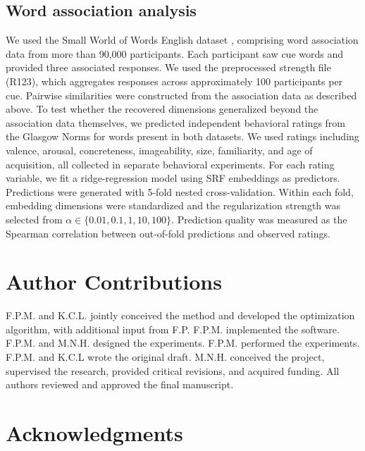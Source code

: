 \documentclass{article}
\begin{document}
\subsection{Word association analysis}

We used the Small World of Words English dataset \citep{DeDeyne2019}, comprising word association data from more than 90{,}000 participants. Each participant saw cue words and provided three associated responses. We used the preprocessed strength file (R123), which aggregates responses across approximately 100 participants per cue. Pairwise similarities were constructed from the association data as described above. To test whether the recovered dimensions generalized beyond the association data themselves, we predicted independent behavioral ratings from the Glasgow Norms \citep{Scott2019} for words present in both datasets. We used ratings including valence, arousal, concreteness, imageability, size, familiarity, and age of acquisition, all collected in separate behavioral experiments. For each rating variable, we fit a ridge-regression model using SRF embeddings as predictors. Predictions were generated with 5-fold nested cross-validation. Within each fold, embedding dimensions were standardized and the regularization strength was selected from $\alpha \in \{0.01, 0.1, 1, 10, 100\}$. Prediction quality was measured as the Spearman correlation between out-of-fold predictions and observed ratings.


\section{Author Contributions}

F.P.M. and K.C.L. jointly conceived the method and developed the optimization algorithm, with additional input from F.P. F.P.M. implemented the software. F.P.M. and M.N.H. designed the experiments. F.P.M. performed the experiments. F.P.M. and K.C.L wrote the original draft. M.N.H. conceived the project, supervised the research, provided critical revisions, and acquired funding. All authors reviewed and approved the final manuscript.


\section{Acknowledgments}
\end{document}
